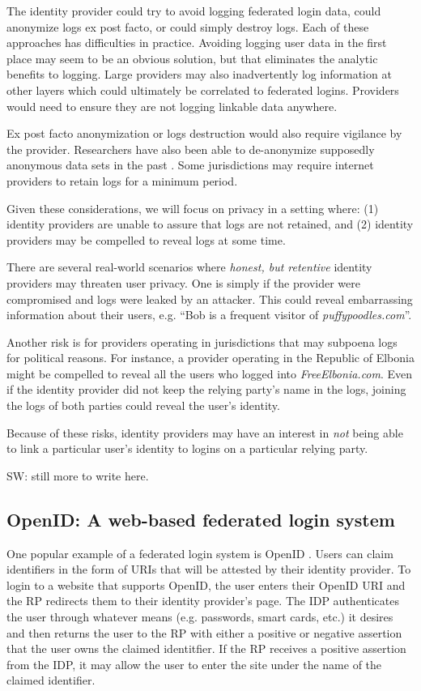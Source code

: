 \documentclass{llncs}
\begin{document}
The identity provider could try to avoid logging federated login data, could
anonymize logs ex post facto, or could simply destroy logs. Each of these
approaches has difficulties in practice. Avoiding logging user data in the first
place may seem to be an obvious solution, but that eliminates the analytic
benefits to logging. Large providers may also inadvertently log information at
other layers which could ultimately be correlated to federated logins. Providers
would need to ensure they are not logging linkable data anywhere.

Ex post facto anonymization or logs destruction would also require vigilance by
the provider. Researchers have also been able to de-anonymize supposedly
anonymous data sets in the past \cite{BarZel06,NaSh08}. Some jurisdictions may
require internet providers to retain logs for a minimum period.

Given these considerations, we will focus on privacy in a setting where:
(1) identity providers are unable to assure that logs are not retained, and
(2) identity providers may be compelled to reveal logs at some time.

There are several real-world scenarios where \emph{honest, but retentive}
identity providers may threaten user privacy. One is simply if the provider were
compromised and logs were leaked by an attacker. This could reveal embarrassing
information about their users, e.g. ``Bob is a frequent visitor of
\emph{puffypoodles.com}''.

Another risk is for providers operating in jurisdictions that may subpoena logs
for political reasons. For instance, a provider operating in the Republic of
Elbonia might be compelled to reveal all the users who logged into
\emph{FreeElbonia.com}. Even if the identity provider did not keep the relying
party's name in the logs, joining the logs of both parties could reveal the
user's identity.

Because of these risks, identity providers may have an interest in \emph{not}
being able to link a particular user's identity to logins on a particular
relying party.

SW: still more to write here.

\subsection{OpenID: A web-based federated login system}

One popular example of a federated login system is OpenID
\cite{OID}. Users can claim identifiers in the form of URIs that will
be attested by their identity provider. To login to a website that
supports OpenID, the user enters their OpenID URI and the RP redirects
them to their identity provider's page. The IDP authenticates the user
through whatever means (e.g. passwords, smart cards, etc.) it desires
and then returns the user to the RP with either a positive or negative
assertion that the user owns the claimed identitfier. If the RP
receives a positive assertion from the IDP, it may allow the user to
enter the site under the name of the claimed identifier.
\end{document}
